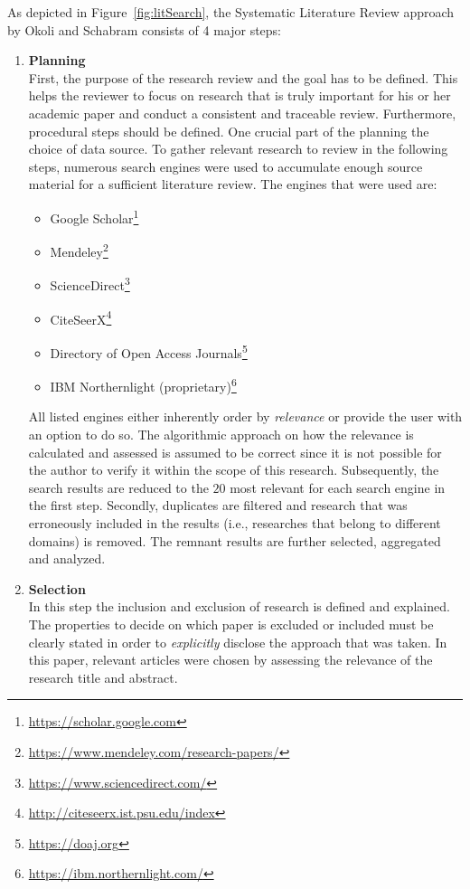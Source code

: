 As depicted in Figure~\vref{fig:litSearch}, the Systematic Literature Review approach by Okoli and Schabram consists of 4 major steps: \\
\begin{enumerate}
    \item
    \textbf{Planning}\\
    First, the purpose of the research review and the goal has to be defined. This helps the reviewer to focus on research that is truly important for his or her academic paper and conduct a consistent and traceable review. Furthermore, procedural steps should be defined. One crucial part of the planning the choice of data source. To gather relevant research to review in the following steps, numerous search engines were used to accumulate enough source material for a sufficient literature review. The engines that were used are: 
    \begin{itemize}[nolistsep]
        \renewcommand\labelitemi{--}
        \item Google Scholar\footnote{\url{https://scholar.google.com}}
        \item Mendeley\footnote{\url{https://www.mendeley.com/research-papers/}}
        \item ScienceDirect\footnote{\url{https://www.sciencedirect.com/}}
        \item CiteSeerX\footnote{\url{http://citeseerx.ist.psu.edu/index}}
        \item Directory of Open Access Journals\footnote{\url{https://doaj.org}}
        \item IBM Northernlight (proprietary)\footnote{\url{https://ibm.northernlight.com/}}
    \end{itemize}
    All listed engines either inherently order by \textit{relevance} or provide the user with an option to do so. The algorithmic approach on how the relevance is calculated and assessed is assumed to be correct since it is not possible for the author to verify it within the scope of this research. Subsequently, the search results are reduced to the $20$ most relevant for each search engine in the first step. Secondly, duplicates are filtered and research that was erroneously included in the results (i.e., researches that belong to different domains) is removed. The remnant results are further selected, aggregated and analyzed.
    \item
    \textbf{Selection}\\
    In this step the inclusion and exclusion of research is defined and explained. The properties to decide on which paper is excluded or included must be clearly stated in order to \textit{explicitly} disclose the approach that was taken. In this paper, relevant articles were chosen by assessing the relevance of the research title and abstract. 

\end{enumerate}
